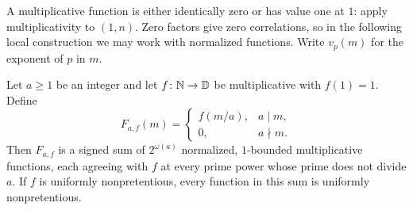 A multiplicative function is either identically zero or has value one
at $1$: apply multiplicativity to $(1,n)$. Zero factors give zero
correlations, so in the following local construction we may work with
normalized functions. Write $v_p(m)$ for the exponent of $p$ in $m$.

\begin{lemma}
\label{lem:affine-dilation}
Let $a\ge1$ be an integer and let $f\colon\mathbb N\to\mathbb D$ be
multiplicative with $f(1)=1$. Define
\begin{equation}
 F_{a,f}(m)=
 \begin{cases}
 f(m/a),&a\mid m,\\
 0,&a\nmid m.
 \end{cases}
 \label{eq:affine-dilation-function}
\end{equation}
Then $F_{a,f}$ is a signed sum of $2^{\omega(a)}$ normalized,
$1$-bounded multiplicative functions, each agreeing with $f$ at every
prime power whose prime does not divide $a$. If $f$ is uniformly
nonpretentious, every function in this sum is uniformly nonpretentious.
\end{lemma}

